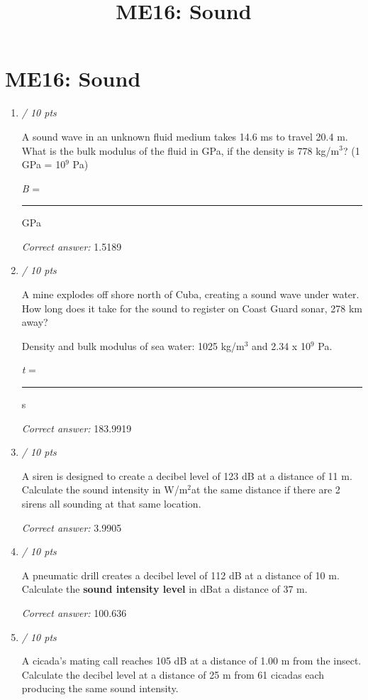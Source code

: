\documentclass[11pt]{article}
\title{ME16: Sound}
\author{}
\date{}
\begin{document}
\maketitle

\section*{ME16: Sound}

\begin{enumerate}[leftmargin=*,label=\textbf{Question \arabic*.}]
\item \hfill \textit{/ 10 pts}

A sound wave in an unknown fluid medium takes 14.6 ms to travel 20.4 m. What is the bulk modulus of the fluid in GPa, if the density is 778 kg/m$^{3}$? (1 GPa = 10$^{9}$ Pa)



\emph{B} = \rule{2cm}{0.4pt} GPa

\textit{Correct answer: } 1.5189

\item \hfill \textit{/ 10 pts}

A mine explodes off shore north of Cuba, creating a sound wave under water. How long does it take for the sound to register on Coast Guard sonar, 278 km away?

Density and bulk modulus of sea water: 1025 kg/m$^{3}$ and 2.34 x 10$^{9}$ Pa.



\emph{t} = \rule{2cm}{0.4pt} s

\textit{Correct answer: } 183.9919

\item \hfill \textit{/ 10 pts}

A siren is designed to create a decibel level of 123 dB at a distance of 11 m. Calculate the sound intensity in W/m$^{2}$at the same distance if there are 2 sirens all sounding at that same location.

\textit{Correct answer: } 3.9905

\item \hfill \textit{/ 10 pts}

A pneumatic drill creates a decibel level of 112 dB at a distance of 10 m. Calculate the \textbf{sound intensity level }in dBat a distance of 37 m.

\textit{Correct answer: } 100.636

\item \hfill \textit{/ 10 pts}

A cicada's mating call reaches 105 dB at a distance of 1.00 m from the insect. Calculate the decibel level at a distance of 25 m from 61 cicadas each producing the same sound intensity.


\end{enumerate}
\end{document}
